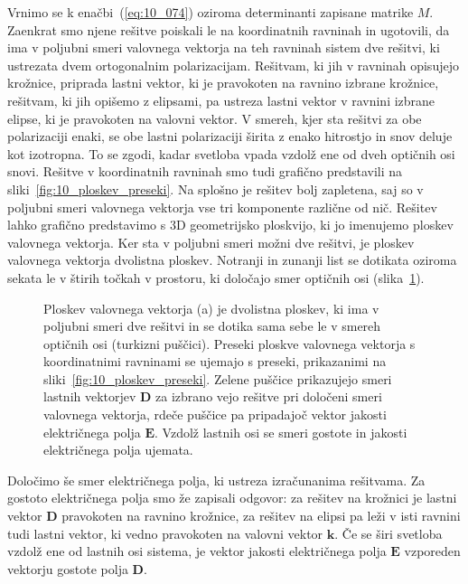 Vrnimo se k enačbi~(\ref{eq:10_074}) oziroma determinanti zapisane matrike $M$. Zaenkrat smo njene 
rešitve poiskali le na koordinatnih ravninah in ugotovili, da ima v poljubni smeri valovnega vektorja
na teh ravninah sistem dve rešitvi, ki ustrezata dvem ortogonalnim polarizacijam. Rešitvam, ki jih
v ravninah opisujejo krožnice, priprada lastni vektor, ki je pravokoten na ravnino izbrane krožnice, 
rešitvam, ki jih opišemo z elipsami, pa ustreza lastni vektor v ravnini izbrane elipse, ki je pravokoten
na valovni vektor. V smereh, kjer
sta rešitvi za obe polarizaciji enaki, se obe lastni polarizaciji širita z enako hitrostjo in snov 
deluje kot izotropna. To se zgodi, kadar svetloba vpada vzdolž ene od dveh optičnih osi snovi.
Rešitve v koordinatnih ravninah smo tudi grafično predstavili na sliki~\ref{fig:10_ploskev_preseki}.
Na splošno je rešitev bolj zapletena, saj so v poljubni smeri valovnega vektorja vse tri komponente 
različne od nič. Rešitev lahko grafično predstavimo s 3D geometrijsko ploskvijo, ki jo imenujemo
ploskev valovnega vektorja. Ker sta v poljubni smeri možni dve rešitvi, je ploskev valovnega vektorja
dvolistna ploskev. Notranji in zunanji list se dotikata oziroma sekata le v štirih točkah v prostoru, ki
določajo smer optičnih osi (slika~\ref{fig:10_ploskev_3D}).

\begin{figure}[h]
\centering
\def\svgwidth{140truemm} 

\caption{Ploskev valovnega vektorja (a) je dvolistna ploskev, ki ima v poljubni smeri dve rešitvi in 
se dotika sama sebe le v smereh optičnih osi (turkizni puščici). Preseki ploskve valovnega vektorja
s koordinatnimi ravninami se ujemajo s preseki, prikazanimi na sliki~\ref{fig:10_ploskev_preseki}.
Zelene puščice prikazujejo smeri lastnih vektorjev $\mathbf{D}$ za izbrano vejo rešitve pri 
določeni smeri valovnega vektorja, rdeče puščice pa pripadajoč vektor jakosti električnega polja 
$\mathbf{E}$. Vzdolž lastnih osi se smeri gostote in jakosti električnega polja ujemata.}
\label{fig:10_ploskev_3D}
\end{figure}
 
Določimo še smer električnega polja, ki ustreza izračunanima rešitvama. Za gostoto električnega polja
smo že zapisali odgovor: za rešitev na krožnici je lastni vektor $\mathbf{D}$ pravokoten
na ravnino krožnice, za rešitev na elipsi pa leži v isti ravnini tudi lastni vektor, ki 
vedno pravokoten na valovni vektor $\mathbf{k}$. Če se širi svetloba vzdolž ene od lastnih osi
sistema, je vektor jakosti električnega polja $\mathbf{E}$ vzporeden vektorju gostote polja $\mathbf{D}$.

